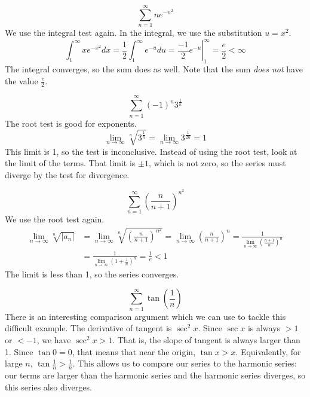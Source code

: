 \documentclass[fleqn]{report}
\begin{document}
\begin{example}
\begin{equation*}
\sum_{n=1}^\infty ne^{-n^2}
\end{equation*}
We use the integral test again. In the integral, we use the
substitution $u =x^2$.
\begin{equation*}
\int_1^\infty x e^{-x^2} dx = \frac{1}{2} \int_1^\infty e^{-u}
du = \left. \frac{-1}{2} e^{-u} \right|_1^\infty = \frac{e}{2} <
\infty 
\end{equation*}
The integral converges, so the sum does as well. Note
that the sum \emph{does not} have the value $\frac{e}{2}$.
\end{example}

\begin{example}
\begin{equation*}
\sum_{n=1}^\infty (-1)^n 3^{\frac{1}{n}} 
\end{equation*}
The root test is good for exponents.
\begin{equation*}
\lim_{n \rightarrow \infty} \sqrt[n]{3^{\frac{1}{n}}} = \lim_{n
\rightarrow \infty} 3^{\frac{1}{2n}} = 1
\end{equation*}
This limit is 1, so the test is inconclusive. Instead of
using the root test, look at the limit of the terms. That
limit is $\pm 1$, which is not zero, so the series must
diverge by the test for divergence.
\end{example}

\begin{example}
\begin{equation*}
\sum_{n=1}^\infty \left( \frac{n}{n+1} \right)^{n^2}
\end{equation*}
We use the root test again.
\begin{align*}
\lim_{n \rightarrow \infty} \sqrt[n]{|a_n|} & = 
\lim_{n \rightarrow \infty} \sqrt[n]{\left(
\frac{n}{n+1}\right)^{n^2} } 
= \lim_{n \rightarrow \infty} \left( \frac{n}{n+1} \right)^n
= \frac{1}{\lim_{n \rightarrow \infty} \left( \frac{n+1}{n}
\right)^n} \\
& = \frac{1}{\lim_{n \rightarrow \infty} \left( 1 + \frac{1}{n}
\right)^n} = \frac{1}{e} < 1
\end{align*}
The limit is less than 1, so the series converges. 
\end{example}

\begin{example}
\begin{equation*}
\sum_{n=1}^\infty \tan \left( \frac{1}{n} \right) 
\end{equation*}
There is an interesting comparison argument which we can use
to tackle this difficult example. The derivative of tangent
is $\sec^2 x$. Since $\sec x$ is always $>1$ or $<-1$, we
have $\sec^2x > 1$. That is, the slope of tangent is always
larger than 1. Since $\tan 0 = 0$, that means that near the
origin, $\tan x > x$. Equivalently, for large $n$, $\tan
\frac{1}{n} > \frac{1}{n}$. This allows us to compare our
series to the harmonic series: our terms are larger than the
harmonic series and the harmonic series diverges, so this
series also diverges.
\end{example}
\end{document}
